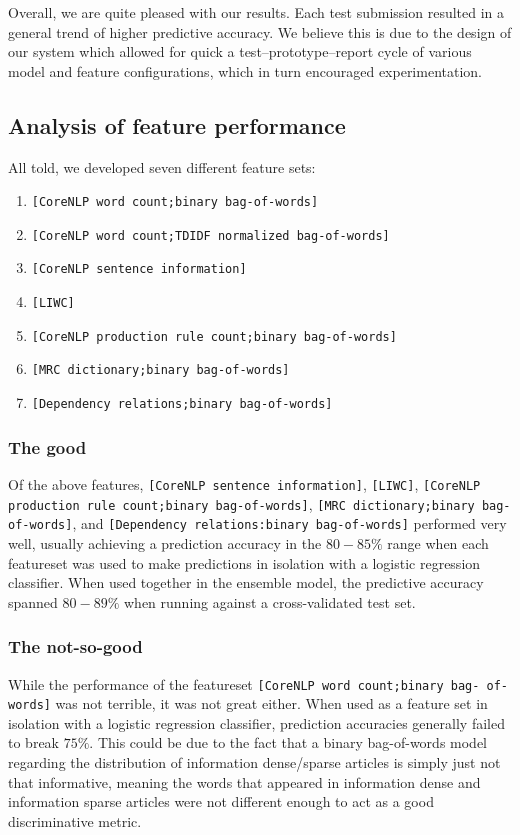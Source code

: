 \documentclass[
10pt, %
a4paper, %
oneside, %
headinclude,footinclude, %
BCOR5mm, %
]{scrartcl}
\begin{document}
Overall, we are quite pleased with our results. Each test submission resulted in
a general trend of higher predictive accuracy. We believe this is due
to the design of our system which allowed for quick a test--prototype--report
cycle of various model and feature configurations, which in turn encouraged
experimentation.

\subsection{Analysis of feature performance}
All told, we developed seven different feature sets: 
\begin{enumerate}
	\item \texttt{[CoreNLP word count;binary bag-of-words]} 
	\item \texttt{[CoreNLP word count;TDIDF normalized bag-of-words]} 
	\item \texttt{[CoreNLP sentence information]} 
	\item \texttt{[LIWC]}
	\item \texttt{[CoreNLP production rule count;binary bag-of-words]}
	\item \texttt{[MRC dictionary;binary bag-of-words]}
	\item \texttt{[Dependency relations;binary bag-of-words]}
\end{enumerate}

\subsubsection{The good}
Of the above features, \texttt{[CoreNLP sentence information]},
\texttt{[LIWC]}, \texttt{[CoreNLP production rule count;binary bag-of-words]}, 
\texttt{[MRC dictionary;binary bag-of-words]}, 
and \texttt{[Dependency relations:binary bag-of-words]} performed very well,
usually achieving a prediction accuracy in the $80-85\%$ range when each
featureset was used to make predictions in isolation with a logistic regression
classifier. When used together in the ensemble model, the predictive accuracy
spanned $80-89\%$ when running against a cross-validated test set.

\subsubsection{The not-so-good}
While the performance of the featureset \texttt{[CoreNLP word count;binary bag-
of-words]} was not terrible, it was not great either. When used as a feature set
in isolation with a logistic regression classifier, prediction accuracies
generally failed to break $75\%$. This could be due to the fact that a binary
bag-of-words model regarding the distribution of information dense/sparse
articles is simply just not that informative, meaning the words that appeared in
information dense and information sparse articles were not different enough to
act as a good discriminative metric.
\end{document}
